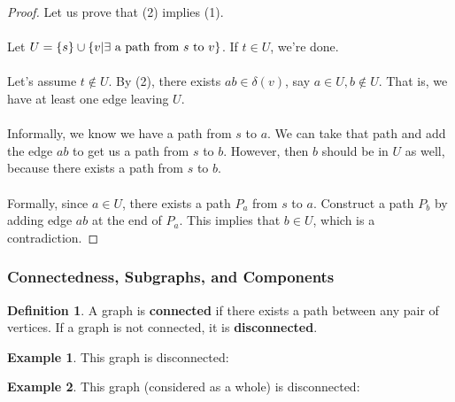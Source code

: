 \documentclass[]{article}
\theoremstyle{definition}
\newtheorem*{defn}{Definition}
\newtheorem{ex}{Example}[section]
\DeclarePairedDelimiter{\set}{\lbrace}{\rbrace}
\begin{document}
				\begin{proof}
					Let us prove that (2) implies (1).
					\\ \\
					Let $U = \set{s} \cup \set{v | \exists \text{ a path from } s \text{ to } v}$. If $t \in U$, we're done. 
					\\ \\
					Let's assume $t \not \in U$. By (2), there exists $ab \in \delta(v)$, say $a \in U, b \not \in U$. That is, we have at least one edge leaving $U$.
					\\ \\
					Informally, we know we have a path from $s$ to $a$. We can take that path and add the edge $ab$ to get us a path from $s$ to $b$. However, then $b$ should be in $U$ as well, because there exists a path from $s$ to $b$.
					\\ \\
					Formally, since $a \in U$, there exists a path $P_a$ from $s$ to $a$. Construct a path $P_b$ by adding edge $ab$ at the end of $P_a$. This implies that $b \in U$, which is a contradiction.
				\end{proof}

			\subsubsection{Connectedness, Subgraphs, and Components}
				\begin{defn}
					A graph is \textbf{connected} if there exists a path between any pair of vertices. If a graph is not connected, it is \textbf{disconnected}.
				\end{defn}
				
				\begin{ex}
					This graph is disconnected:
					\begin{center}
					\end{center}
				\end{ex}

				\begin{ex}
					This graph (considered as a whole) is disconnected:
					\begin{center}
					\end{center}
				\end{ex}
\end{document}
